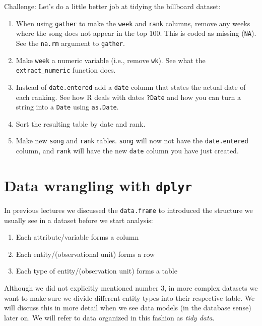 \documentclass[12pt,]{book}
\providecommand{\tightlist}{%
  \setlength{\itemsep}{0pt}\setlength{\parskip}{0pt}}
\theoremstyle{definition}
\theoremstyle{definition}
\theoremstyle{remark}
\begin{document}
Challenge: Let's do a little better job at tidying the billboard
dataset:

\begin{enumerate}
\def\labelenumi{\arabic{enumi}.}
\tightlist
\item
  When using \texttt{gather} to make the \texttt{week} and \texttt{rank}
  columns, remove any weeks where the song does not appear in the top
  100. This is coded as missing (\texttt{NA}). See the \texttt{na.rm}
  argument to \texttt{gather}.\\
\item
  Make \texttt{week} a numeric variable (i.e., remove \texttt{wk}). See
  what the \texttt{extract\_numeric} function does.\\
\item
  Instead of \texttt{date.entered} add a \texttt{date} column that
  states the actual date of each ranking. See how R deals with dates
  \texttt{?Date} and how you can turn a string into a \texttt{Date}
  using \texttt{as.Date}.\\
\item
  Sort the resulting table by date and rank.
\item
  Make new \texttt{song} and \texttt{rank} tables. \texttt{song} will
  now not have the \texttt{date.entered} column, and \texttt{rank} will
  have the new \texttt{date} column you have just created.
\end{enumerate}

\section{\texorpdfstring{Data wrangling with
\texttt{dplyr}}{Data wrangling with dplyr}}\label{data-wrangling-with-dplyr}

In previous lectures we discussed the \texttt{data.frame} to introduced
the structure we usually see in a dataset before we start analysis:

\begin{enumerate}
\def\labelenumi{\arabic{enumi}.}
\tightlist
\item
  Each attribute/variable forms a column
\item
  Each entity/(observational unit) forms a row
\item
  Each type of entity/(observation unit) forms a table
\end{enumerate}

Although we did not explicitly mentioned number 3, in more complex
datasets we want to make sure we divide different entity types into
their respective table. We will discuss this in more detail when we see
data models (in the database sense) later on. We will refer to data
organized in this fashion as \emph{tidy data}.
\end{document}
